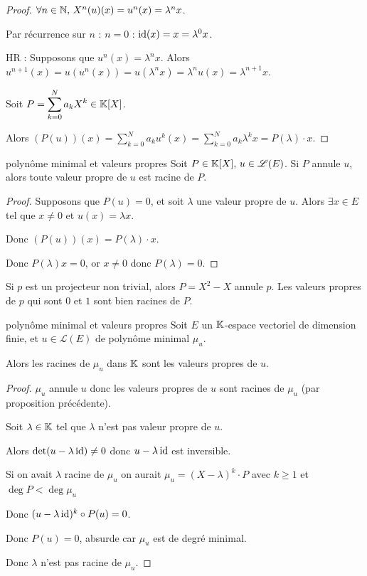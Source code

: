 \begin{proof}
    $\forall n \in \mathbb{N}, \, X^n(u)(x) = u^n(x) = \lambda^n x$.

    Par récurrence sur $n$ : $n = 0$ : $\operatorname{id}(x) = x = \lambda^0 x$.

    HR : Supposons que $u^n(x) = \lambda^n x$. Alors $u^{n + 1}(x) = u(u^n(x)) = u(\lambda^n x) = \lambda^n u(x) = \lambda^{n + 1} x$.

    Soit $P = \displaystyle \sum_{k = 0 }^{ N } a_k X^k \in \mathbb{K}[X]$.

    Alors $(P(u))(x) = \sum_{k = 0 }^{ N } a_k u^k(x) = \sum_{k = 0 }^{ N } a_k \lambda^k x = P(\lambda) \cdot x$.
\end{proof}

\begin{proposition}{polynôme minimal et valeurs propres}{}
    Soit $P \in \mathbb{K}[X], \, u \in \mathscr L(E)$. Si $P$ annule $u$, alors toute valeur propre de 
    $u$ est racine de $P$.
\end{proposition}

\begin{proof}
    Supposons que $P(u) = 0$, et soit $\lambda $ une valeur propre de $u$. Alors 
    $\exists x \in E$ tel que $x \neq 0$ et $u(x) = \lambda x$.

    Donc $(P(u))(x) = P(\lambda) \cdot x$.

    Donc $P(\lambda)x = 0$, or $x \neq 0$ donc $P(\lambda) = 0$.
\end{proof}

\begin{exemple}
    Si $p$ est un projecteur non trivial, alors $P = X^2 -X$ annule $p$. Les valeurs propres de 
    $p$ qui sont $0$ et $1$ sont bien racines de $P$.
\end{exemple}

\begin{proposition}{polynôme minimal et valeurs propres}{}
    Soit $E$ un $\mathbb{K}$-espace vectoriel de dimension finie, et $u \in \mathscr L(E)$ de polynôme minimal $\mu_u$.

    Alors les racines de $\mu_u$ dans $\mathbb{K}$ sont les valeurs propres de $u$.
\end{proposition}

\begin{proof}
    $\mu_u$ annule $u$ donc les valeurs propres de $u$ sont racines de $\mu_u$ (par proposition précédente).

    Soit $\lambda \in \mathbb{K}$ tel que $\lambda$ n'est pas valeur propre de $u$. 

    Alors $\det(u - \lambda \operatorname{id}) \neq 0$ donc $u - \lambda \operatorname{id}$ est inversible.

    Si on avait $\lambda $ racine de $\mu_u$ on aurait $\mu_u = (X - \lambda)^k \cdot P$ avec $k \geqslant 1$ et 
    $\deg P < \deg \mu_u$

    Donc $(u - \lambda \operatorname{id})^k \circ P(u) = 0$. 

    Donc $P(u) = 0$, absurde car $\mu_u$ est de degré minimal.

    Donc $\lambda$ n'est pas racine de $\mu_u$.
\end{proof}

